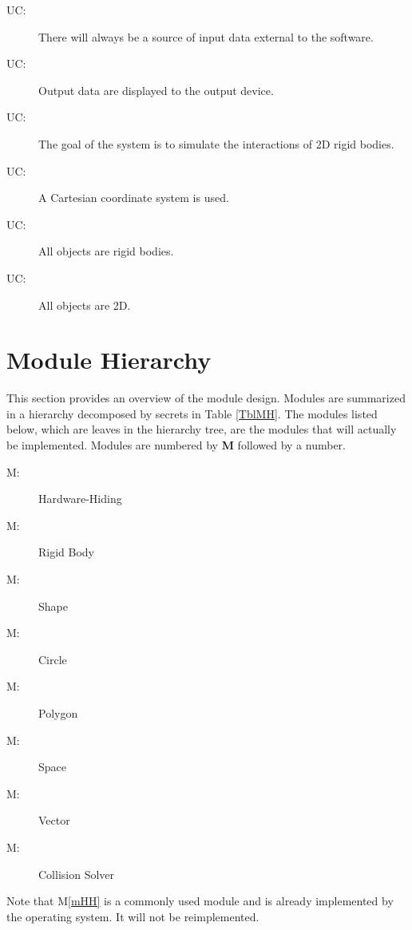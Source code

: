 \documentclass[12pt]{article}
\newcounter{ucnum}
\newcommand{\uctheucnum}{UC\theucnum}
\newcounter{mnum}
\newcommand{\mthemnum}{M\themnum}
\newcommand{\mref}[1]{M\ref{#1}}
\newcommand{\authornote}[3]{}
\newcommand{\olu}[1]{\authornote{red}{OO}{#1}}
\begin{document}
\begin{description}
\item[ \uctheucnum \label{ucInput}:] There will always be a source of input data external to the software.
\item[ \uctheucnum \label{ucOutput}:] Output data are
  displayed to the output device.
\item[ \uctheucnum \label{ucGoal}:] The goal of the system is to simulate the interactions of 2D rigid bodies.
\item[ \uctheucnum \label{ucCartesian}:] A Cartesian 
coordinate system is used.
\item[ \uctheucnum \label{ucRigid}:] All objects
are rigid bodies.
\item[ \uctheucnum \label{uc2D}:] All objects
are 2D.
\end{description}

\section{Module Hierarchy} \label{SecMH}

This section provides an overview of the module design. Modules are summarized
in a hierarchy decomposed by secrets in Table \ref{TblMH}. The modules listed
below, which are leaves in the hierarchy tree, are the modules that will
actually be implemented.  Modules are numbered by \textbf{M}
followed by a number.

\begin{description}
\item [ \mthemnum \label{mHH}:] Hardware-Hiding 
\item [ \mthemnum \label{mBody}:] Rigid Body 
\item [ \mthemnum \label{mShape}:] Shape 
\item [ \mthemnum \label{mCircle}:] Circle
\item [ \mthemnum \label{mPoly}:] Polygon
\item [ \mthemnum \label{mSpace}:] Space  
\item [ \mthemnum \label{mVector}:] Vector
\item [ \mthemnum \label{mSolver}:] Collision Solver 
\end{description}
\noindent
Note that \mref{mHH} is a commonly used module and is already implemented by the operating
system.  It will not be reimplemented.
\end{document}

